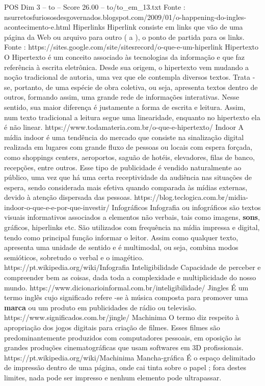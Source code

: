 \begin{textsample}{POS Dim 3 – to – Score 26.00 – to/to\_em\_13.txt}
Fonte : nsurretosfuriososdesgovernados.blogspot.com/2009/01/o-happening-do-ingles-acontecimento-e.html Hiperlinks Hiperlink consiste em links que vão de uma página da Web ou arquivo para outro ( a ), o ponto de partida para os links.
Fonte : https://sites.google.com/site/sitesrecord/o-que-e-um-hiperlink Hipertexto O Hipertexto é um conceito associado às tecnologias da informação e que faz referência à escrita eletrônica.
Desde sua origem, o hipertexto vem mudando a noção tradicional de autoria, uma vez que ele contempla diversos textos.
Trata -se, portanto, de uma espécie de obra coletiva, ou seja, apresenta textos dentro de outros, formando assim, uma grande rede de informações interativas.
Nesse sentido, sua maior diferença é justamente a forma de escrita e leitura.
Assim, num texto tradicional a leitura segue uma linearidade, enquanto no hipertexto ela é não linear. https://www.todamateria.com.br/o-que-e-hipertexto/ Indoor A mídia indoor é uma tendência do mercado que consiste na sinalização digital realizada em lugares com grande fluxo de pessoas ou locais com espera forçada, como shoppings centers, aeroportos, saguão de hotéis, elevadores, filas de banco, recepções, entre outros.
Esse tipo de publicidade é vendido naturalmente ao público, uma vez que há uma certa receptividade da audiência nas situações de espera, sendo considerada mais efetiva quando comparada às mídias externas, devido à atenção dispersada das pessoas. https://blog.teclogica.com.br/midia-indoor-o-que-e-e-por-que-investir/ Infográficos Infografia ou infográficos são textos visuais informativos associados a elementos não verbais, tais como imagens, \textbf{sons}, gráficos, hiperlinks etc.
São utilizados com frequência na mídia impressa e digital, tendo como principal função informar o leitor.
Assim como qualquer texto, apresenta uma unidade de sentido e é multimodal, ou seja, combina modos semióticos, sobretudo o verbal e o imagético. https://pt.wikipedia.org/wiki/Infografia Inteligibilidade Capacidade de perceber e compreender bem as coisas, dada toda a complexidade e multiplicidade do nosso mundo. https://www.dicionarioinformal.com.br/inteligibilidade/ Jingles É um termo inglês cujo significado refere -se à música composta para promover uma \textbf{marca} ou um produto em publicidades de rádio ou televisão. https://www.significados.com.br/jingle/ Machinima O termo diz respeito à apropriação dos jogos digitais para criação de filmes.
Esses filmes são predominantemente produzidos com computadores pessoais, em oposição às grandes produções cinematográficas que usam softwares em 3D profissionais. https://pt.wikipedia.org/wiki/Machinima Mancha-gráfica É o espaço delimitado de impressão dentro de uma página, onde cai tinta sobre o papel ; fora destes limites, nada pode ser impresso e nenhum elemento pode ultrapassar.

\end{textsample}
